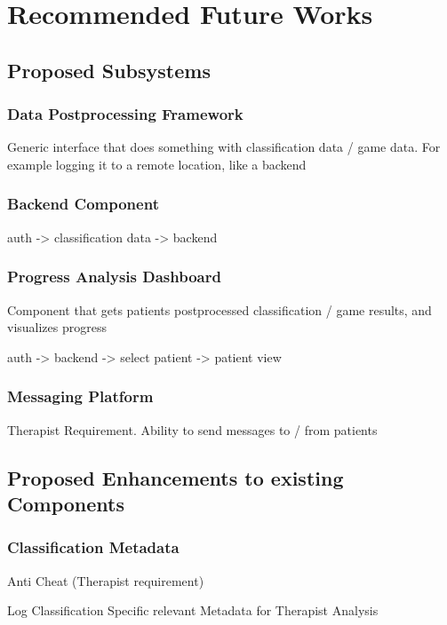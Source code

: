 \chapter{Recommended Future Works}
\section{Proposed Subsystems}
\subsection{Data Postprocessing Framework}
Generic interface that does something with classification data / game data. For example logging it to a remote location, like a backend

\subsection{Backend Component}

auth -> classification data -> backend
\subsection{Progress Analysis Dashboard}
Component that gets patients postprocessed classification / game results, and visualizes progress

auth -> backend -> select patient -> patient view
\subsection{Messaging Platform}
Therapist Requirement. Ability to send messages to / from patients
\section{Proposed Enhancements to existing Components}
\subsection{Classification Metadata}
Anti Cheat (Therapist requirement)

Log Classification Specific relevant Metadata for Therapist Analysis
